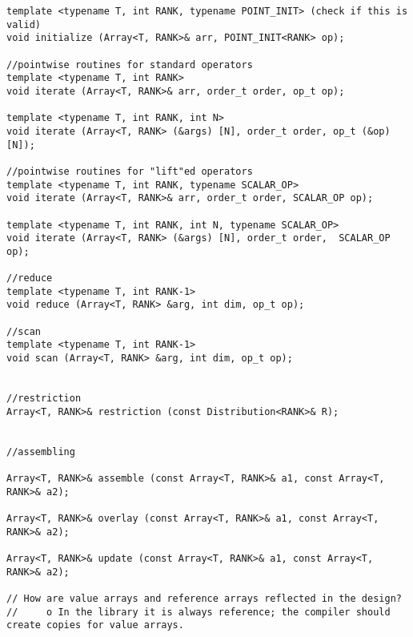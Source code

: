 \begin{verbatim}
template <typename T, int RANK, typename POINT_INIT> (check if this is valid)
void initialize (Array<T, RANK>& arr, POINT_INIT<RANK> op);

//pointwise routines for standard operators
template <typename T, int RANK>
void iterate (Array<T, RANK>& arr, order_t order, op_t op);

template <typename T, int RANK, int N>
void iterate (Array<T, RANK> (&args) [N], order_t order, op_t (&op)[N]);

//pointwise routines for "lift"ed operators
template <typename T, int RANK, typename SCALAR_OP>
void iterate (Array<T, RANK>& arr, order_t order, SCALAR_OP op);

template <typename T, int RANK, int N, typename SCALAR_OP>
void iterate (Array<T, RANK> (&args) [N], order_t order,  SCALAR_OP op);

//reduce
template <typename T, int RANK-1>
void reduce (Array<T, RANK> &arg, int dim, op_t op);

//scan
template <typename T, int RANK-1>
void scan (Array<T, RANK> &arg, int dim, op_t op);


//restriction
Array<T, RANK>& restriction (const Distribution<RANK>& R);	


//assembling

Array<T, RANK>& assemble (const Array<T, RANK>& a1, const Array<T, RANK>& a2);	

Array<T, RANK>& overlay (const Array<T, RANK>& a1, const Array<T, RANK>& a2);	

Array<T, RANK>& update (const Array<T, RANK>& a1, const Array<T, RANK>& a2);	

// How are value arrays and reference arrays reflected in the design?
//     o In the library it is always reference; the compiler should create copies for value arrays.

\end{verbatim}